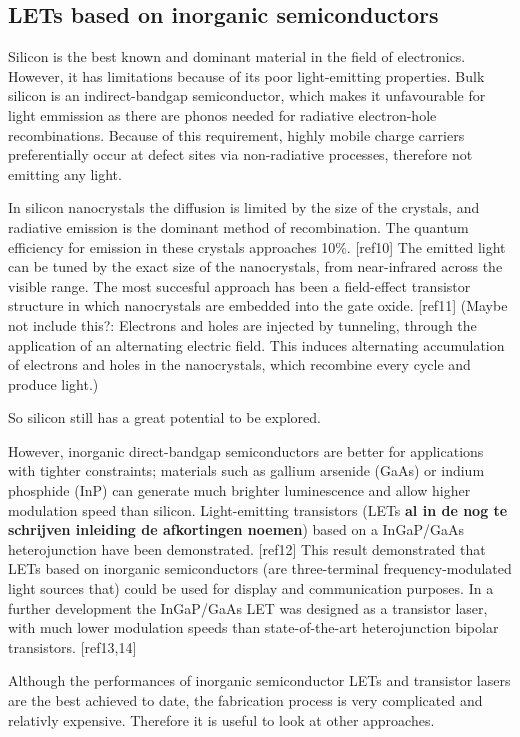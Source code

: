 \subsection{LETs based on inorganic semiconductors} %

Silicon is the best known and dominant material in the field of electronics. However, it has limitations because of its poor light-emitting properties. Bulk silicon is an indirect-bandgap semiconductor, which makes it unfavourable for light emmission as there are phonos needed for radiative electron-hole recombinations. Because of this requirement, highly mobile charge carriers preferentially occur at defect sites via non-radiative processes, therefore not emitting any light.

In silicon nanocrystals the diffusion is limited by the size of the crystals, and radiative emission is the dominant method of recombination. The quantum efficiency for emission in these crystals approaches 10\%. [ref10] The emitted light can be tuned by the exact size of the nanocrystals, from near-infrared across the visible range. The most succesful approach has been a field-effect transistor structure in which nanocrystals are embedded into the gate oxide. [ref11] (Maybe not include this?: Electrons and holes are injected by tunneling, through the application of an alternating electric field. This induces alternating accumulation of electrons and holes in the nanocrystals, which recombine every cycle and produce light.)

So silicon still has a great potential to be explored.

However, inorganic direct-bandgap semiconductors are better for applications with tighter constraints; materials such as gallium arsenide (GaAs) or indium phosphide (InP) can generate much brighter luminescence and allow higher modulation speed than silicon. Light-emitting transistors (LETs \textbf{al in de nog te schrijven inleiding de afkortingen noemen}) based on a InGaP/GaAs heterojunction have been demonstrated. [ref12] This result demonstrated that LETs based on inorganic semiconductors (are three-terminal frequency-modulated light sources that) could be used for display and communication purposes. In a further development the InGaP/GaAs LET was designed as a transistor laser, with much lower modulation speeds than state-of-the-art heterojunction bipolar transistors. [ref13,14]

Although the performances of inorganic semiconductor LETs and transistor lasers are the best achieved to date, the fabrication process is very complicated and relativly expensive. Therefore it is useful to look at other approaches.
